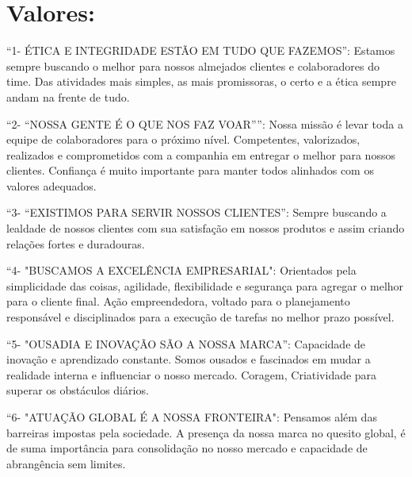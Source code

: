 \documentclass[
    12pt,               %
    openright,          %
    oneside,
    a4paper,            %
    draft,              %
    MODELO,             %
    TODO,               %
    english,            %
    brazil              %
    ]{ifsp-spo-inf-ctds}
\begin{document}
	\section{\textbf{Valores:}}
	    \begin{description}
	    \item “1- ÉTICA E INTEGRIDADE ESTÃO EM TUDO QUE FAZEMOS”:
        Estamos sempre buscando o melhor para nossos almejados clientes e colaboradores do time. Das atividades mais simples, as mais promissoras, o certo e a ética sempre andam na frente de tudo.
        
        \item “2- “NOSSA GENTE É O QUE NOS FAZ VOAR””:
        Nossa missão é levar toda a equipe de colaboradores para o próximo nível. Competentes, valorizados, realizados e comprometidos com a companhia em entregar o melhor para nossos clientes. Confiança é muito importante para manter todos alinhados com os valores adequados.     
        
        \item “3- “EXISTIMOS PARA SERVIR NOSSOS CLIENTES”:
        Sempre buscando a lealdade de nossos clientes com sua satisfação em nossos produtos e assim criando relações fortes e duradouras.
        
        \item “4- "BUSCAMOS A EXCELÊNCIA EMPRESARIAL":
        Orientados pela simplicidade das coisas, agilidade, flexibilidade e segurança para agregar o melhor para o cliente final. Ação empreendedora, voltado para o planejamento responsável e disciplinados para a execução de tarefas no melhor prazo possível.
        
        \item “5- "OUSADIA E INOVAÇÃO SÃO A NOSSA MARCA”:
        Capacidade de inovação e aprendizado constante. Somos ousados e fascinados em mudar a realidade interna e influenciar o nosso mercado. Coragem, Criatividade para superar os obstáculos diários.
        
        \item “6- "ATUAÇÃO GLOBAL É A NOSSA FRONTEIRA":
        Pensamos além das barreiras impostas pela sociedade. A presença da nossa marca no quesito global, é de suma importância para consolidação no nosso mercado e capacidade de abrangência sem limites.        
	    \end{description}
        
\end{document}
